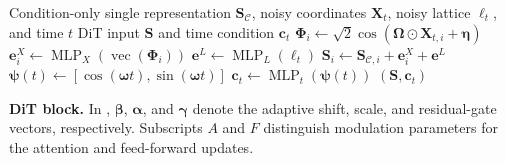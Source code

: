 \begin{algorithm}[H]
\caption{Noisy-state and time embedding}
\label{alg:noisy-state-embedding}
\begin{algorithmic}[1]
\Require Condition-only single representation $\mathbf S_{\mathcal C}$,
noisy coordinates $\mathbf X_t$, noisy lattice $\boldsymbol\ell_t$, and time $t$
\Ensure DiT input $\mathbf S$ and time condition $\mathbf c_t$
\State $\boldsymbol\Phi_i
    \gets\sqrt{2}\cos(\boldsymbol\Omega\odot\mathbf X_{t,i}
    +\boldsymbol\eta)$
\State $\mathbf e_i^X\gets
    \operatorname{MLP}_X(\operatorname{vec}(\boldsymbol\Phi_i))$
\Statex
{}
\State $\mathbf e^L\gets\operatorname{MLP}_L(\boldsymbol\ell_t)$
\State $\mathbf S_i\gets
    \mathbf S_{\mathcal C,i}+\mathbf e_i^X+\mathbf e^L$
\Statex
{}
\State $\boldsymbol\psi(t)\gets
    [\cos(\boldsymbol\omega t),\sin(\boldsymbol\omega t)]$
\State $\mathbf c_t\gets\operatorname{MLP}_t(\boldsymbol\psi(t))$
\State \Return $(\mathbf S,\mathbf c_t)$
\end{algorithmic}
\end{algorithm}

\textbf{DiT block.} In , $\boldsymbol\beta$, $\boldsymbol\alpha$, and $\boldsymbol\gamma$ denote the adaptive shift, scale, and residual-gate vectors, respectively. Subscripts $A$ and $F$ distinguish modulation parameters for the attention and feed-forward updates.

